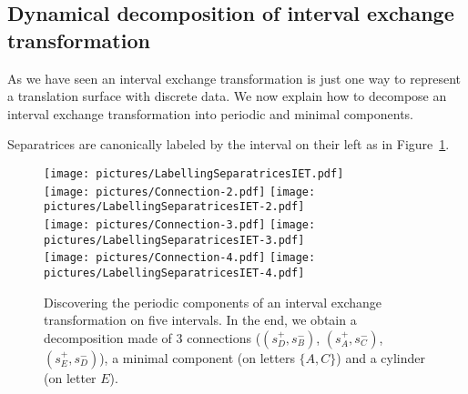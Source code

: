 \documentclass[a4paper,12pt]{article}
\begin{document}
\subsection{Dynamical decomposition of interval exchange transformation}

As we have seen an interval exchange transformation is just one way to represent
a translation surface with discrete data. We now explain how to decompose an
interval exchange transformation into periodic and minimal components.

Separatrices are canonically labeled by the interval on their left as in
Figure~\ref{fig:LabellingSeparatricesIET}.
\begin{figure}[!ht]
\begin{center}
\texttt{[image: pictures/LabellingSeparatricesIET.pdf]} \\
\texttt{[image: pictures/Connection-2.pdf]}%
\hspace{0.5cm}%
\texttt{[image: pictures/LabellingSeparatricesIET-2.pdf]} \\
\texttt{[image: pictures/Connection-3.pdf]}%
\hspace{0.5cm}%
\texttt{[image: pictures/LabellingSeparatricesIET-3.pdf]} \\
\texttt{[image: pictures/Connection-4.pdf]}%
\hspace{0.5cm}%
\texttt{[image: pictures/LabellingSeparatricesIET-4.pdf]}
\end{center}
\caption{Discovering the periodic components of an interval exchange transformation
on five intervals. In the end, we obtain a decomposition made of 3 connections
($(s^+_D, s^-_B)$, $(s^+_A, s^-_C)$, $(s^+_E, s^-_D)$),
a minimal component (on letters $\{A, C\}$) and a cylinder (on letter $E$).}
\label{fig:LabellingSeparatricesIET}
\end{figure}
\end{document}
